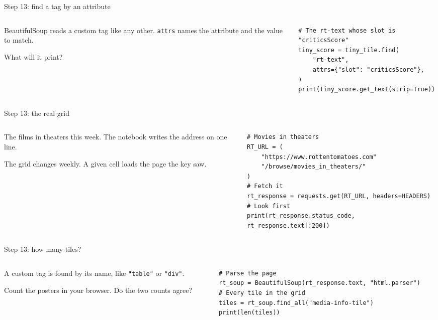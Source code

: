 \documentclass[9pt,aspectratio=169]{beamer}
\begin{document}
\begin{frame}[fragile]{Step 13: find a tag by an attribute}
    \begin{columns}[T]
        \begin{column}{0.37\textwidth}
            BeautifulSoup reads a custom tag like any other. \texttt{attrs} names the attribute and the value to match.

            \medskip
            What will it print?
        \end{column}
        \begin{column}{0.6\textwidth}
\begin{lstlisting}
# The rt-text whose slot is "criticsScore"
tiny_score = tiny_tile.find(
    "rt-text",
    attrs={"slot": "criticsScore"},
)
print(tiny_score.get_text(strip=True))
\end{lstlisting}
        \end{column}
    \end{columns}
\end{frame}

\begin{frame}[fragile]{Step 13: the real grid}
    \begin{columns}[T]
        \begin{column}{0.37\textwidth}
            The films in theaters this week. The notebook writes the address on one line.

            \medskip
            The grid changes weekly. A given cell loads the page the key saw.
        \end{column}
        \begin{column}{0.6\textwidth}
\begin{lstlisting}
# Movies in theaters
RT_URL = (
    "https://www.rottentomatoes.com"
    "/browse/movies_in_theaters/"
)
# Fetch it
rt_response = requests.get(RT_URL, headers=HEADERS)
# Look first
print(rt_response.status_code, rt_response.text[:200])
\end{lstlisting}
        \end{column}
    \end{columns}
\end{frame}

\begin{frame}[fragile]{Step 13: how many tiles?}
    \begin{columns}[T]
        \begin{column}{0.37\textwidth}
            A custom tag is found by its name, like \texttt{"table"} or \texttt{"div"}.

            \medskip
            Count the posters in your browser. Do the two counts agree?
        \end{column}
        \begin{column}{0.6\textwidth}
\begin{lstlisting}
# Parse the page
rt_soup = BeautifulSoup(rt_response.text, "html.parser")
# Every tile in the grid
tiles = rt_soup.find_all("media-info-tile")
print(len(tiles))
\end{lstlisting}
        \end{column}
    \end{columns}
\end{frame}
\end{document}
